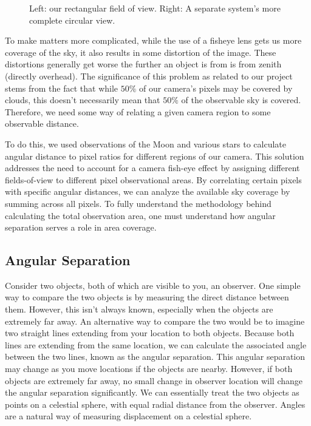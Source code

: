 \begin{figure}[ht!]
  \caption{Left: our rectangular field of view.  Right:  A separate system's more complete circular view.}
  \label{views_sidebyside}
\end{figure}

To make matters more complicated, while the use of a fisheye lens gets us more coverage of the sky, it also results in some distortion of the image.
These distortions generally get worse the further an object is from is from zenith (directly overhead).
The significance of this problem as related to our project stems from the fact that while $50\% $ of our camera's pixels may be covered by clouds, this doesn't necessarily mean that $50\%$ of the observable sky is covered.
Therefore, we need some way of relating a given camera region to some observable distance.

To do this, we used observations of the Moon and various stars to calculate angular distance to pixel ratios for different regions of our camera.
This solution addresses the need to account for a camera fish-eye effect by assigning different fields-of-view to different pixel observational areas.
By correlating certain pixels with specific angular distances, we can analyze the available sky coverage by summing across all pixels.
To fully understand the methodology behind calculating the total observation area, one must understand how angular separation serves a role in area coverage.

\subsection{Angular Separation}

Consider two objects, both of which are visible to you, an observer.
One simple way to compare the two objects is by measuring the direct distance between them.
However, this isn't always known, especially when the objects are extremely far away.
An alternative way to compare the two would be to imagine two straight lines extending from your location to both objects.  
Because both lines are extending from the same location, we can calculate the associated angle between the two lines, known as the angular separation.
This angular separation may change as you move locations if the objects are nearby. However, if both objects are extremely far away, no small change in observer location will change the angular separation significantly.
We can essentially treat the two objects as points on a celestial sphere, with equal radial distance from the observer.  
Angles are a natural way of measuring displacement on a celestial sphere.


